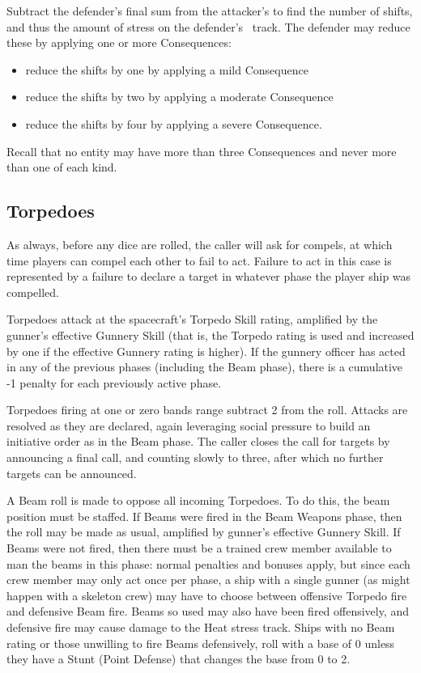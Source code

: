 
Subtract the defender's final sum from the attacker's to find the number of shifts, and thus the amount of stress on the defender's \Frame\ track. The defender may reduce these by applying one or more Consequences:
\begin{itemize}
\item reduce the shifts by one by applying a mild Consequence
\item reduce the shifts by two by applying a moderate Consequence
\item reduce the shifts by four by applying a severe Consequence.
\end{itemize}

Recall that no entity may have more than three Consequences and never more than one of each kind.


\subsection{Torpedoes}\label{sec:Torpedoes} %

As always, before any dice are rolled, the caller will ask for compels, at which time players can compel each other to fail to act. Failure to act in this case is represented by a failure to declare a target in whatever phase the player ship was compelled.

Torpedoes attack at the spacecraft's Torpedo Skill rating, amplified by the gunner's effective Gunnery Skill (that is, the Torpedo rating is used and increased by one if the effective Gunnery rating is higher). If the gunnery officer has acted in any of the previous phases (including the Beam phase), there is a cumulative -1 penalty for each previously active phase.

Torpedoes firing at one or zero bands range subtract 2 from the roll. Attacks are resolved as they are declared, again leveraging social pressure to build an initiative order as in the Beam phase. The caller closes the call for targets by announcing a final call, and counting slowly to three, after which no further targets can be announced.

A Beam roll is made to oppose all incoming Torpedoes. To do this, the beam position must be staffed. If Beams were fired in the Beam Weapons phase, then the roll may be made as usual, amplified by gunner's effective Gunnery Skill. If Beams were not fired, then there must be a trained crew member available to man the beams in this phase: normal penalties and bonuses apply, but since each crew member may only act once per phase, a ship with a single gunner (as might happen with a skeleton crew) may have to choose between offensive Torpedo fire and defensive Beam fire. Beams so used may also have been fired offensively, and defensive fire may cause damage to the Heat stress track. Ships with no Beam rating or those unwilling to fire Beams defensively, roll with a base of 0 unless they have a Stunt (Point Defense) that changes the base from 0 to 2.

